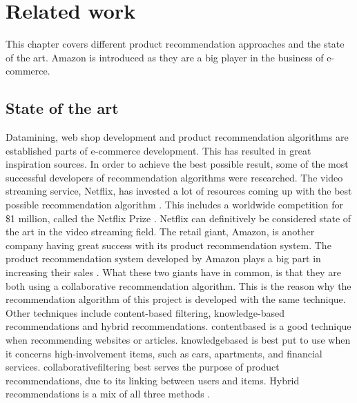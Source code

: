 
\chapter{Related work} %

\label{RelatedWork} %

This chapter covers different product recommendation approaches and the state of the art. Amazon is introduced as they are a big player in the business of e-commerce.

\section{State of the art}

Datamining, web shop development and product recommendation algorithms are established parts of e-commerce development. This has resulted in great inspiration sources. In order to achieve the best possible result, some of the most successful developers of recommendation algorithms were researched. The video streaming service, Netflix, has invested a lot of resources coming up with the best possible recommendation algorithm \cite{Netflix}. This includes a worldwide competition for \$1 million, called the Netflix Prize \cite{NetflixPrize}. Netflix can definitively be considered state of the art in the video streaming field. The retail giant, Amazon, is another company having great success with its product recommendation system. The product recommendation system developed by Amazon plays a big part in increasing their sales \cite{AmazonSuccess}. What these two giants have in common, is that they are both using a collaborative recommendation algorithm. This is the reason why the recommendation algorithm of this project is developed with the same technique. Other techniques include content-based filtering, knowledge-based recommendations and hybrid recommendations. \gls{contentbased} is a good technique when recommending websites or articles. \gls{knowledgebased} is best put to use when it concerns high-involvement items, such as cars, apartments, and financial services. \gls{collaborativefiltering} best serves the purpose of product recommendations, due to its linking between users and items. Hybrid recommendations is a mix of all three methods \cite{recommendationtechniques}.


